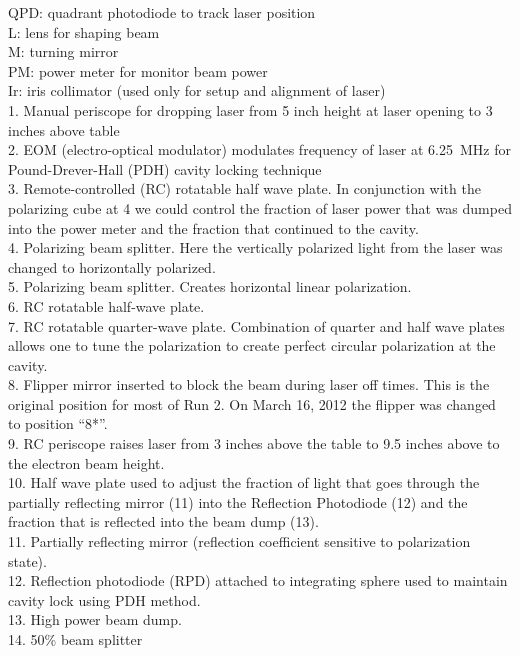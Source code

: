 {\footnotesize{\noindent
QPD: quadrant photodiode to track laser position\\
L: lens for shaping beam\\
M: turning mirror\\
PM: power meter for monitor beam power\\
Ir: iris collimator (used only for setup and alignment of laser)\\
1. Manual periscope for dropping laser from 5 inch height at laser opening to 3 inches above table\\
2. EOM (electro-optical modulator) modulates frequency of laser at 6.25~MHz for Pound-Drever-Hall (PDH) cavity locking technique\\
3. Remote-controlled (RC) rotatable half wave plate. In conjunction with the polarizing cube at 4 we could control the fraction of laser power that was dumped into the power meter and the fraction that continued to the cavity.\\
4. Polarizing beam splitter. Here the vertically polarized light from the laser was changed to horizontally polarized.\\
5. Polarizing beam splitter. Creates horizontal linear polarization.\\
6. RC rotatable half-wave plate.\\
7. RC rotatable quarter-wave plate.  Combination of quarter and half wave plates allows one to tune the polarization to create perfect circular polarization at the cavity.\\
8. Flipper mirror inserted to block the beam during laser off times. This is the original position for most of Run 2. On March 16, 2012 the flipper was changed to position ``8*''.\\
9. RC periscope raises laser from 3 inches above the table to 9.5 inches above to the electron beam height.\\
10. Half wave plate used to adjust the fraction of light that goes through the partially reflecting mirror (11) into the Reflection Photodiode (12) and the fraction that is reflected into the beam dump (13).\\
11. Partially reflecting mirror (reflection coefficient sensitive to polarization state).\\
12. Reflection photodiode (RPD) attached to integrating sphere used to maintain cavity lock using PDH method.\\
13. High power beam dump.\\
14. 50\% beam splitter\\
}}
